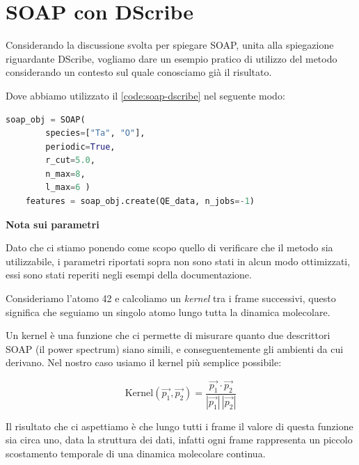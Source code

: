 \documentclass[a4paper,11pt,openany]{book}
\begin{document}
\section{SOAP con DScribe}

Considerando la discussione svolta per spiegare SOAP, unita alla spiegazione riguardante DScribe, vogliamo dare un esempio pratico di utilizzo del metodo considerando un contesto sul quale conosciamo già il risultato.

Dove abbiamo utilizzato il \autoref{code:soap-dscribe} nel seguente modo:

\begin{lstlisting}[caption={Snippet usato per il dataset A}, label={code:soap-dataset-a}, language=Python]
    soap_obj = SOAP(
        species=["Ta", "O"],
        periodic=True,       
        r_cut=5.0,      
        n_max=8,         
        l_max=6 )
    features = soap_obj.create(QE_data, n_jobs=-1)
\end{lstlisting}


\begin{tcolorbox}[
    center,
    fontupper=\footnotesize,
    colback=white,
    boxrule=0.8pt,
    colframe=gray!60,
    width=0.90\linewidth,
    arc=3mm
]
\textbf{Nota sui parametri}

Dato che ci stiamo ponendo come scopo quello di verificare che il metodo sia utilizzabile, i parametri riportati sopra non sono stati in alcun modo ottimizzati, essi sono stati reperiti negli esempi della documentazione. 
\end{tcolorbox}


Consideriamo l'atomo 42 e calcoliamo un \textit{kernel} tra i frame successivi, questo significa che seguiamo un singolo atomo lungo tutta la dinamica molecolare.

Un kernel è una funzione che ci permette di misurare quanto due descrittori SOAP (il power spectrum) siano simili, e conseguentemente gli ambienti da cui derivano. Nel nostro caso usiamo il kernel più semplice possibile:

\begin{equation}
    \mathrm{Kernel}(\vec{p_1},\vec{p_2}) = \frac{\vec{p_1}\cdot\vec{p_2}}{|\vec{p_1}|\,|\vec{p_2}|}
    \label{eq:kernel-lineare}
\end{equation}

Il risultato che ci aspettiamo è che lungo tutti i frame il valore di questa funzione sia circa uno, data la struttura dei dati, infatti ogni frame rappresenta un piccolo scostamento temporale di una dinamica molecolare continua.
\end{document}
